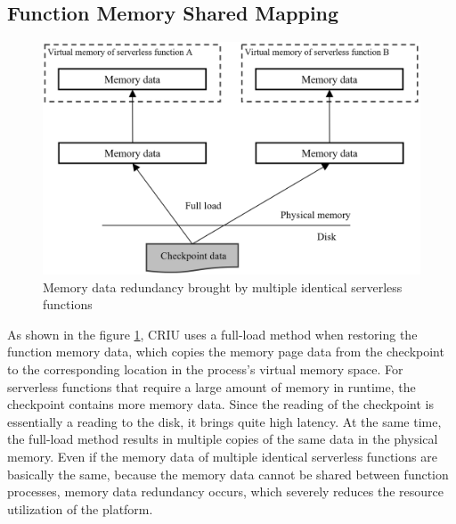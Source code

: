 \subsection{Function Memory Shared Mapping}
\begin{figure}[t]
    \centering
    \includegraphics[width=\linewidth]{images/full-load-memory.PNG}
    \caption{Memory data redundancy brought by multiple identical serverless functions}
    \label{full-load-memory}
\end{figure}

As shown in the figure \ref{full-load-memory}, 
CRIU uses a full-load method when restoring the function memory data, 
which copies the memory page data from the checkpoint to the corresponding location in the process's virtual memory space. 
For serverless functions that require a large amount of memory in runtime, the checkpoint contains more memory data. 
Since the reading of the checkpoint is essentially a reading to the disk, 
it brings quite high latency. 
At the same time, 
the full-load method results in multiple copies of the same data in the physical memory. 
Even if the memory data of multiple identical serverless functions are basically the same, 
because the memory data cannot be shared between function processes, 
memory data redundancy occurs, 
which severely reduces the resource utilization of the platform.

